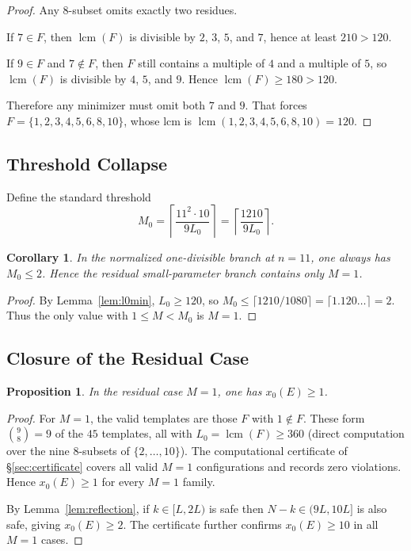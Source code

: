 \documentclass[11pt]{article}
\newtheorem{proposition}[theorem]{Proposition}
\newtheorem{corollary}[theorem]{Corollary}
\theoremstyle{definition}
\begin{document}
\begin{proof}
  Any $8$-subset omits exactly two residues.

  If $7 \in F$, then $\operatorname{lcm}(F)$ is divisible by $2$, $3$, $5$,
  and $7$, hence at least $210 > 120$.

  If $9 \in F$ and $7 \notin F$, then $F$ still contains a multiple of
  $4$ and a multiple of $5$, so $\operatorname{lcm}(F)$ is divisible by
  $4$, $5$, and $9$.
  Hence $\operatorname{lcm}(F) \geq 180 > 120$.

  Therefore any minimizer must omit both $7$ and $9$.
  That forces $F = \{1,2,3,4,5,6,8,10\}$, whose lcm is
  $\operatorname{lcm}(1,2,3,4,5,6,8,10) = 120$.
\end{proof}

\subsection{Threshold Collapse}
\label{sec:threshold}

Define the standard threshold
\[
  M_0 = \left\lceil \frac{11^2 \cdot 10}{9 L_0} \right\rceil
        = \left\lceil \frac{1210}{9 L_0} \right\rceil.
\]

\begin{corollary}
  \label{cor:threshold}
  In the normalized one-divisible branch at $n = 11$, one always has
  $M_0 \leq 2$.
  Hence the residual small-parameter branch contains only $M = 1$.
\end{corollary}

\begin{proof}
  By Lemma~\ref{lem:l0min}, $L_0 \geq 120$, so
  $M_0 \leq \lceil 1210 / 1080 \rceil = \lceil 1.120\ldots \rceil = 2$.
  Thus the only value with $1 \leq M < M_0$ is $M = 1$.
\end{proof}

\subsection{Closure of the Residual Case}
\label{sec:residual}

\begin{proposition}
  \label{prop:residual}
  In the residual case $M = 1$, one has $x_0(E) \geq 1$.
\end{proposition}

\begin{proof}
  For $M = 1$, the valid templates are those $F$ with $1 \notin F$.
  These form $\binom{9}{8} = 9$ of the $45$ templates, all with
  $L_0 = \operatorname{lcm}(F) \geq 360$ (direct computation over the nine
  $8$-subsets of $\{2,\ldots,10\}$).
  The computational certificate of \S\ref{sec:certificate} covers all
  valid $M = 1$ configurations and records zero violations.
  Hence $x_0(E) \geq 1$ for every $M = 1$ family.

  By Lemma~\ref{lem:reflection}, if $k \in [L, 2L)$ is safe then
  $N - k \in (9L, 10L]$ is also safe, giving $x_0(E) \geq 2$.
  The certificate further confirms $x_0(E) \geq 10$ in all $M = 1$ cases.
\end{proof}
\end{document}
